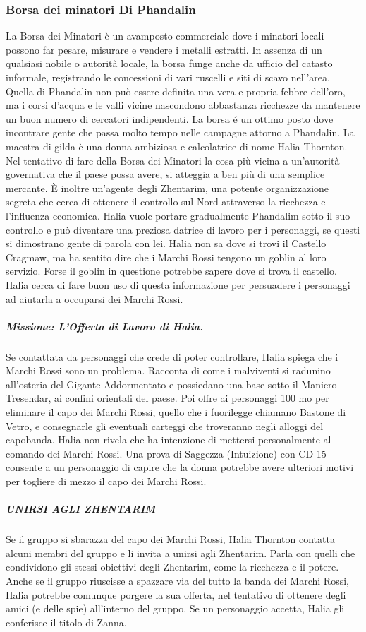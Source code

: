 \documentclass{article}
\begin{document}
\subsubsection{Borsa dei minatori Di Phandalin}
\hypertarget{borsa}{}
La Borsa dei Minatori è un avamposto commerciale dove
i minatori locali possono far pesare, misurare e vendere i
metalli estratti. In assenza di un qualsiasi nobile o autorità
locale, la borsa funge anche da ufficio del catasto informale,
registrando le concessioni di vari ruscelli e siti di scavo
nell’area. Quella di Phandalin non può essere definita una
vera e propria febbre dell'oro, ma i corsi d’acqua e le valli vicine nascondono abbastanza ricchezze da mantenere un
buon numero di cercatori indipendenti.
La borsa é un ottimo posto dove incontrare gente che passa
molto tempo nelle campagne attorno a Phandalin. La maestra
di gilda è una donna ambiziosa e calcolatrice di nome Halia
Thornton. Nel tentativo di fare della Borsa dei Minatori la
cosa più vicina a un'autorità governativa che il paese possa
avere, si atteggia a ben più di una semplice mercante. È
inoltre un'agente degli Zhentarim, una potente organizzazione
segreta che cerca di ottenere il controllo sul Nord attraverso
la ricchezza e l'influenza economica. Halia vuole portare
gradualmente Phandalim sotto il suo controllo e può diventare
una preziosa datrice di lavoro per i personaggi, se questi si
dimostrano gente di parola con lei.
Halia non sa dove si trovi il Castello Cragmaw, ma ha
sentito dire che i Marchi Rossi tengono un goblin al loro
servizio. Forse il goblin in questione potrebbe sapere dove
si trova il castello. Halia cerca di fare buon uso di questa
informazione per persuadere i personaggi ad aiutarla a
occuparsi dei Marchi Rossi.
\subparagraph{Missione: L’Offerta di Lavoro di Halia.}Se contattata
da personaggi che crede di poter controllare, Halia spiega
che i Marchi Rossi sono un problema. Racconta di come i
malviventi si radunino all’osteria del Gigante Addormentato
e possiedano una base sotto il Maniero Tresendar, ai confini
orientali del paese. Poi offre ai personaggi 100 mo per
eliminare il capo dei Marchi Rossi, quello che i fuorilegge
chiamano Bastone di Vetro, e consegnarle gli eventuali
carteggi che troveranno negli alloggi del capobanda. Halia
non rivela che ha intenzione di mettersi personalmente
al comando dei Marchi Rossi. Una prova di Saggezza (Intuizione) con CD 15 consente a un personaggio di capire
che la donna potrebbe avere ulteriori motivi per togliere di
mezzo il capo dei Marchi Rossi.

\subparagraph{UNIRSI AGLI ZHENTARIM}
Se il gruppo si sbarazza del capo dei Marchi Rossi, Halia
Thornton contatta alcuni membri del gruppo e li invita a
unirsi agli Zhentarim. Parla con quelli che condividono gli
stessi obiettivi degli Zhentarim, come la ricchezza e il potere.
Anche se il gruppo riuscisse a spazzare via del tutto la banda
dei Marchi Rossi, Halia potrebbe comunque porgere la sua
offerta, nel tentativo di ottenere degli amici (e delle spie)
all’interno del gruppo. Se un personaggio accetta, Halia gli
conferisce il titolo di Zanna.
\end{document}
